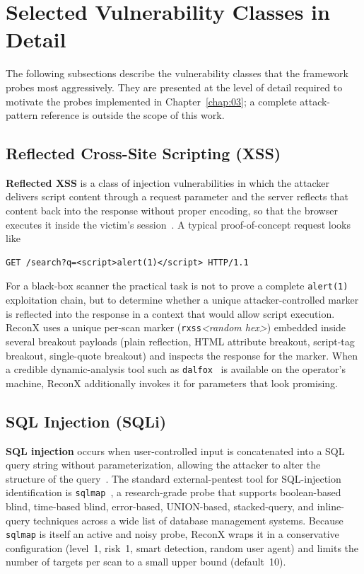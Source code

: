 \section{Selected Vulnerability Classes in Detail}

The following subsections describe the vulnerability classes that the framework probes most aggressively. They are presented at the level of detail required to motivate the probes implemented in Chapter~\ref{chap:03}; a complete attack-pattern reference is outside the scope of this work.

\subsection{Reflected Cross-Site Scripting (XSS)}

\textbf{Reflected XSS} is a class of injection vulnerabilities in which the attacker delivers script content through a request parameter and the server reflects that content back into the response without proper encoding, so that the browser executes it inside the victim's session~\cite{owasp_xss, portswigger_xss}. A typical proof-of-concept request looks like

\begin{lstlisting}[basicstyle=\ttfamily\small]
GET /search?q=<script>alert(1)</script> HTTP/1.1
\end{lstlisting}

For a black-box scanner the practical task is not to prove a complete \texttt{alert(1)} exploitation chain, but to determine whether a unique attacker-controlled marker is reflected into the response in a context that would allow script execution. ReconX uses a unique per-scan marker (\texttt{rxss}\textit{<random hex>}) embedded inside several breakout payloads (plain reflection, HTML attribute breakout, script-tag breakout, single-quote breakout) and inspects the response for the marker. When a credible dynamic-analysis tool such as \texttt{dalfox}~\cite{dalfox} is available on the operator's machine, ReconX additionally invokes it for parameters that look promising.

\subsection{SQL Injection (SQLi)}

\textbf{SQL injection} occurs when user-controlled input is concatenated into a SQL query string without parameterization, allowing the attacker to alter the structure of the query~\cite{owasp_sqli}. The standard external-pentest tool for SQL-injection identification is \texttt{sqlmap}~\cite{sqlmap}, a research-grade probe that supports boolean-based blind, time-based blind, error-based, UNION-based, stacked-query, and inline-query techniques across a wide list of database management systems. Because \texttt{sqlmap} is itself an active and noisy probe, ReconX wraps it in a conservative configuration (level~1, risk~1, smart detection, random user agent) and limits the number of targets per scan to a small upper bound (default~10).

